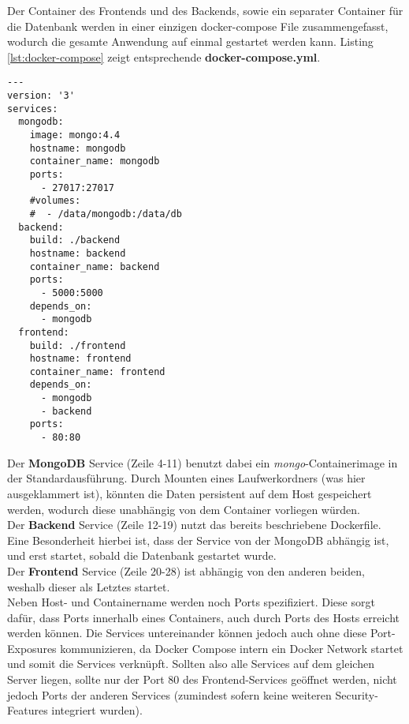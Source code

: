 Der Container des Frontends und des Backends, sowie ein separater Container für die Datenbank werden in einer einzigen docker-compose File zusammengefasst, wodurch die gesamte Anwendung auf einmal gestartet werden kann. Listing \ref{lst:docker-compose} zeigt entsprechende \textbf{docker-compose.yml}.

\begin{lstlisting}[caption={docker-compose},captionpos=b,showstringspaces=false, basicstyle=\small,label={lst:docker-compose}]
---
version: '3'
services:
  mongodb:
    image: mongo:4.4
    hostname: mongodb
    container_name: mongodb
    ports:
      - 27017:27017
    #volumes:
    #  - /data/mongodb:/data/db
  backend:
    build: ./backend
    hostname: backend
    container_name: backend
    ports:
      - 5000:5000
    depends_on: 
      - mongodb
  frontend:
    build: ./frontend
    hostname: frontend
    container_name: frontend
    depends_on:
      - mongodb
      - backend
    ports:
      - 80:80

\end{lstlisting}

Der \textbf{MongoDB} Service (Zeile 4-11) benutzt dabei ein \textit{mongo}-Containerimage in der Standardausführung.
Durch Mounten eines Laufwerkordners (was hier ausgeklammert ist), könnten die Daten persistent auf dem Host gespeichert werden, wodurch diese unabhängig von dem Container vorliegen würden. \\
Der \textbf{Backend} Service (Zeile 12-19) nutzt das bereits beschriebene Dockerfile. Eine Besonderheit hierbei ist, dass der Service von der MongoDB abhängig ist, und erst startet, sobald die Datenbank gestartet wurde.\\
Der \textbf{Frontend} Service (Zeile 20-28) ist abhängig von den anderen beiden, weshalb dieser als Letztes startet. \\

Neben Host- und Containername werden noch Ports spezifiziert. 
Diese sorgt dafür, dass Ports innerhalb eines Containers, auch durch Ports des Hosts erreicht werden können. 
Die Services untereinander können jedoch auch ohne diese Port-Exposures kommunizieren, da Docker Compose intern ein Docker Network startet und somit die Services verknüpft.
Sollten also alle Services auf dem gleichen Server liegen, sollte nur der Port 80 des Frontend-Services geöffnet werden, nicht jedoch Ports der anderen Services (zumindest sofern keine weiteren Security-Features integriert wurden).\\

